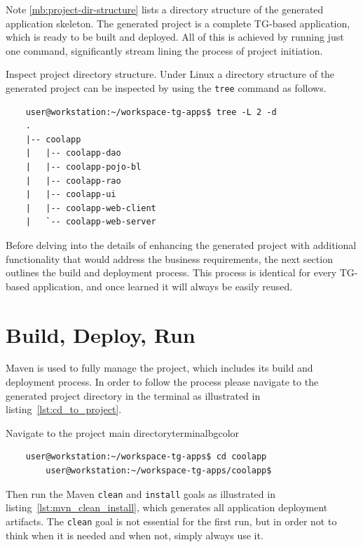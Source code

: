   Note \ref{mb:project-dir-structure} lists a directory structure of the generated application skeleton.
  The generated project is a complete TG-based application, which is ready to be built and deployed.
  All of this is achieved by running just one command, significantly stream lining the process of project initiation.
 
  \begin{notebox}{Inspect project directory structure.}{\label{mb:project-dir-structure}}
      Under Linux a directory structure of the generated project can be inspected by using the \texttt{tree} command as follows.
	
      \begin{verbatim}
	user@workstation:~/workspace-tg-apps$ tree -L 2 -d
	.
	|-- coolapp
	|   |-- coolapp-dao
	|   |-- coolapp-pojo-bl
	|   |-- coolapp-rao
	|   |-- coolapp-ui
	|   |-- coolapp-web-client
	|   `-- coolapp-web-server
      \end{verbatim}
  \end{notebox}

  Before delving into the details of enhancing the generated project with additional functionality that would address the business requirements, the next section outlines the build and deployment process.
  This process is identical for every TG-based application, and once learned it will always be easily reused.

\section{Build, Deploy, Run}
  Maven is used to fully manage the project, which includes its build and deployment process.
  In order to follow the process please navigate to the generated project directory in the terminal as illustrated in listing~\ref{lst:cd_to_project}.
  
  \begin{code}{Navigate to the project main directory}{\label{lst:cd_to_project}}{terminalbgcolor}
      \begin{lstlisting}
	user@workstation:~/workspace-tg-apps$ cd coolapp
        user@workstation:~/workspace-tg-apps/coolapp$
      \end{lstlisting}
  \end{code}

  Then run the Maven \texttt{clean} and \texttt{install} goals as illustrated in listing~\ref{lst:mvn_clean_install}, which generates all application deployment artifacts.
  The \texttt{clean} goal is not essential for the first run, but in order not to think when it is needed and when not, simply always use it.

